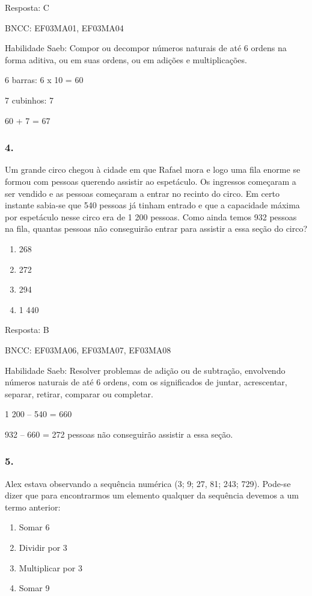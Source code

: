 Resposta: C

BNCC: EF03MA01, EF03MA04

Habilidade Saeb: Compor ou decompor números naturais de até 6 ordens na
forma aditiva, ou em suas ordens, ou em adições e multiplicações.

6 barras: 6 x 10 = 60

7 cubinhos: 7

60 + 7 = 67

\subsubsection{4.}\label{section-159}

Um grande circo chegou à cidade em que Rafael mora e logo uma fila
enorme se formou com pessoas querendo assistir ao espetáculo. Os
ingressos começaram a ser vendido e as pessoas começaram a entrar no
recinto do circo. Em certo instante sabia-se que 540 pessoas já tinham
entrado e que a capacidade máxima por espetáculo nesse circo era de 1
200 pessoas. Como ainda temos 932 pessoas na fila, quantas pessoas não
conseguirão entrar para assistir a essa seção do circo?

\begin{enumerate}
\def\labelenumi{\alph{enumi})}
\item
  268
\item
  272
\item
  294
\item
  1 440
\end{enumerate}

Resposta: B

BNCC: EF03MA06, EF03MA07, EF03MA08

Habilidade Saeb: Resolver problemas de adição ou de subtração,
envolvendo números naturais de até 6 ordens, com os significados de
juntar, acrescentar, separar, retirar, comparar ou completar.

1 200 -- 540 = 660

932 -- 660 = 272 pessoas não conseguirão assistir a essa seção.

\subsubsection{5.}\label{section-160}

Alex estava observando a sequência numérica (3; 9; 27, 81; 243; 729).
Pode-se dizer que para encontrarmos um elemento qualquer da sequência
devemos a um termo anterior:

\begin{enumerate}
\def\labelenumi{\alph{enumi})}
\item
  Somar 6
\item
  Dividir por 3
\item
  Multiplicar por 3
\item
  Somar 9
\end{enumerate}

